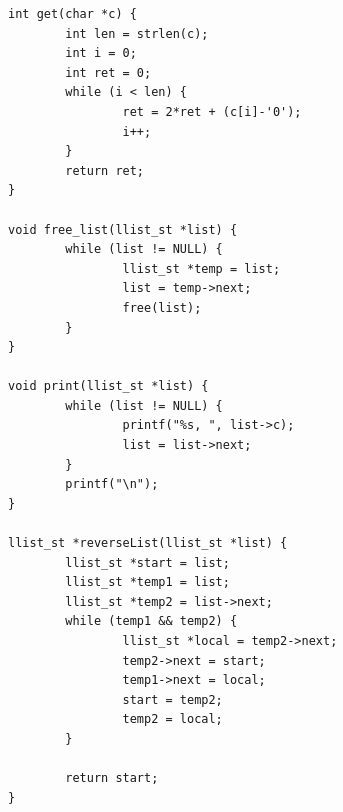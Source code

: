 \documentclass[11pt]{article}
\begin{document}
\begin{lstlisting}
int get(char *c) {
        int len = strlen(c);
        int i = 0;
        int ret = 0;
        while (i < len) {
                ret = 2*ret + (c[i]-'0');
                i++;
        }
        return ret;
}

void free_list(llist_st *list) {
        while (list != NULL) {
                llist_st *temp = list;
                list = temp->next;
                free(list);
        }
}

void print(llist_st *list) {
        while (list != NULL) {
                printf("%s, ", list->c);
                list = list->next;
        }
        printf("\n");
}

llist_st *reverseList(llist_st *list) {
        llist_st *start = list;
        llist_st *temp1 = list;
        llist_st *temp2 = list->next;
        while (temp1 && temp2) {
                llist_st *local = temp2->next;
                temp2->next = start;
                temp1->next = local;
                start = temp2;
                temp2 = local;
        }

        return start;
}
\end{lstlisting}
\end{document}
